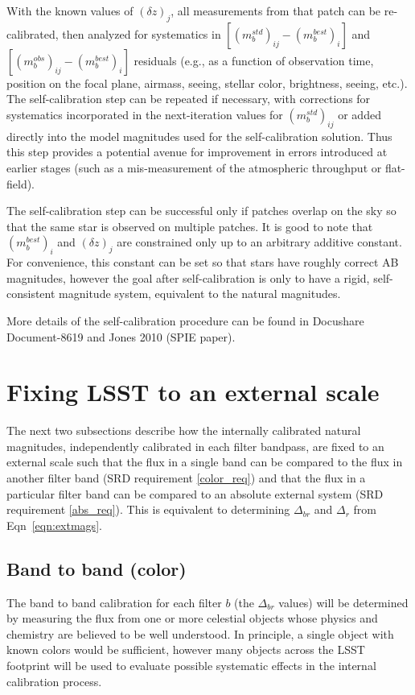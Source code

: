 \documentclass[12pt,preprint]{aastex}
\begin{document}
With the known values of $(\delta z)_j$, all measurements from that
patch can be re-calibrated, then analyzed for systematics in
$[(m_b^{std})_{ij} - (m_b^{best})_{i}]$ and $[(m_b^{obs})_{ij} -
(m_b^{best})_{i}]$ residuals (e.g., as a function of observation time,
position on the focal plane, airmass, seeing, stellar color,
brightness, seeing, etc.). The self-calibration step can be repeated
if necessary, with corrections for systematics incorporated in the
next-iteration values for $(m_b^{std})_{ij}$ or added directly into
the model magnitudes used for the self-calibration solution. Thus this
step provides a potential avenue for improvement in errors introduced
at earlier stages (such as a mis-measurement of the atmospheric
throughput or flat-field). 

The self-calibration step can be successful only if patches
overlap on the sky so that the same star is observed on 
multiple patches. It is good to note that $(m_b^{best})_{i}$ and 
$(\delta z)_j$ are constrained only up to an arbitrary 
additive constant. For convenience, this constant can be set so that
stars have roughly correct AB magnitudes, however the goal after
self-calibration is only to have a rigid, self-consistent magnitude
system, equivalent to the natural magnitudes.

More details of the self-calibration procedure can be found in
Docushare Document-8619 and Jones 2010 (SPIE paper). 


\section{Fixing LSST to an external scale}
\label{sec:calib_external}

The next two subsections describe how the internally calibrated
natural magnitudes, independently calibrated in each filter bandpass, are fixed
to an external scale such that the flux in a single band can be compared to the
flux in another filter band (SRD requirement \ref{color_req}) and that
the flux in a particular filter band can be compared to an absolute
external system (SRD requirement \ref{abs_req}). This is equivalent to
determining $\Delta_{br}$ and $\Delta_r$ from Eqn~\ref{eqn:extmags}. 

\subsection{Band to band (color)}

The band to band calibration for each filter $b$ (the $\Delta_{br}$
values) will be determined by measuring the flux from one or more
celestial objects whose physics and chemistry are believed to be well
understood. In principle, a single object with known colors would be
sufficient, however many objects across the LSST footprint
will be used to evaluate possible systematic effects in the internal
calibration process. 
\end{document}
